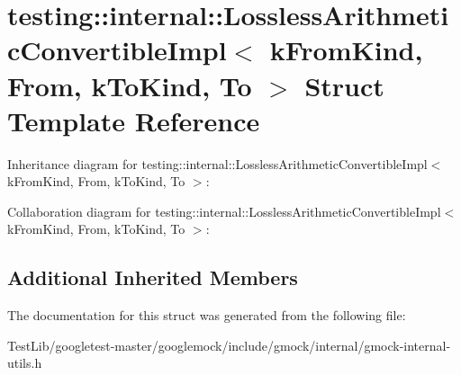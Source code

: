 \hypertarget{structtesting_1_1internal_1_1LosslessArithmeticConvertibleImpl}{}\section{testing\+:\+:internal\+:\+:Lossless\+Arithmetic\+Convertible\+Impl$<$ k\+From\+Kind, From, k\+To\+Kind, To $>$ Struct Template Reference}
\label{structtesting_1_1internal_1_1LosslessArithmeticConvertibleImpl}


Inheritance diagram for testing\+:\+:internal\+:\+:Lossless\+Arithmetic\+Convertible\+Impl$<$ k\+From\+Kind, From, k\+To\+Kind, To $>$\+:


Collaboration diagram for testing\+:\+:internal\+:\+:Lossless\+Arithmetic\+Convertible\+Impl$<$ k\+From\+Kind, From, k\+To\+Kind, To $>$\+:
\subsection*{Additional Inherited Members}


The documentation for this struct was generated from the following file\+:\begin{DoxyCompactItemize}
\item 
Test\+Lib/googletest-\/master/googlemock/include/gmock/internal/gmock-\/internal-\/utils.\+h\end{DoxyCompactItemize}
